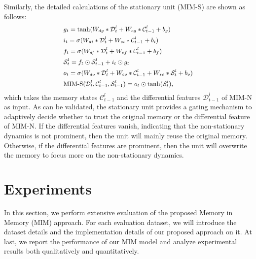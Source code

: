 \documentclass[10pt,twocolumn,letterpaper]{article}
\begin{document}
Similarly, the detailed calculations of the stationary unit (MIM-S) are shown as follows:
\begin{equation}\label{equ:non-stationary}
  \small
  \begin{split}
  & g_t = \tanh(W_{dg} \ast \mathcal{D}_t^l + W_{cg} \ast \mathcal{C}_{t-1}^l + b_g) \\
  & i_t = \sigma(W_{di} \ast \mathcal{D}_t^l + W_{ci} \ast \mathcal{C}_{t-1}^l + b_i)\\
  & f_t = \sigma(W_{df} \ast \mathcal{D}_t^l + W_{cf} \ast \mathcal{C}_{t-1}^l + b_f) \\
  & \mathcal{S}_t^l = f_t \odot \mathcal{S}_{t-1}^l + i_t \odot g_t \\
  & o_t = \sigma(W_{do} \ast \mathcal{D}_t^l + W_{co} \ast \mathcal{C}_{t-1}^l + W_{so} \ast \mathcal{S}_t^l + b_o) \\ 
  & \text{MIM-S}(\mathcal{D}_t^l, \mathcal{C}_{t-1}^l, \mathcal{S}_{t-1}^l) = o_t \odot \tanh(\mathcal{S}_t^l),\\
  \end{split}
\end{equation}
which takes the memory states $\mathcal{C}_{t-1}^l$ and the differential features $\mathcal{D}_{t-1}^l$ of MIM-N as input. As can be validated, the stationary unit provides a gating mechanism to adaptively decide whether to trust the original memory or the differential feature of MIM-N. If the differential features vanish, indicating that the non-stationary dynamics is not prominent, then the unit will mainly reuse the original memory. Otherwise, if the differential features are prominent, then the unit will overwrite the memory to focus more on the non-stationary dynamics. 


\section{Experiments}
\label{sec:Experiments}
In this section, we perform extensive evaluation of the proposed Memory in Memory (MIM) approach. For each evaluation dataset, we will introduce the dataset details and the implementation details of our proposed approach on it. At last, we report the performance of our MIM model and analyze experimental results both qualitatively and quantitatively.
\end{document}
